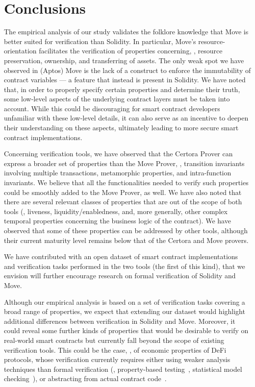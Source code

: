 \section{Conclusions}
\label{sec:conclusions}

The empirical analysis of our study validates the folklore knowledge 
that Move is better suited for verification than Solidity.
In particular, Move's resource-orientation facilitates the verification of properties concerning, \eg, resource preservation, ownership, and transferring of assets.
The only weak spot we have observed in (Aptos) Move
is the lack of a construct to enforce the immutability of contract variables ---
a feature that instead is present in Solidity.
We have noted that, in order to properly specify certain properties and determine their truth, some low-level aspects of the underlying contract layers must be taken into account.
While this could be discouraging for smart contract developers unfamiliar with these low-level details, it can also serve as an incentive to deepen their understanding on these aspects, ultimately leading to more secure smart contract implementations.  

Concerning verification tools,
we have observed that the Certora Prover can express a broader
set of properties than the Move Prover, \eg, 
transition invariants involving multiple transactions,
metamorphic properties,   
and intra-function invariants.
We believe that all the functionalities needed to verify such properties 
could be smoothly added to the Move Prover, as well. 
We have also noted that there are several relevant classes of properties that are out of the scope of both tools (\eg, liveness, liquidity/enabledness, and, more generally, other complex temporal properties concerning the business logic of the contract).
We have observed that some of these properties can be addressed by other tools, although their current maturity level remains below that of the Certora and Move provers.

We have contributed with an open dataset of smart contract implementations and verification tasks performed in the two tools (the first of this kind), that we envision will further encourage research on %
formal verification of Solidity and Move.

Although our empirical analysis is based on a set of \nTotProperties verification tasks covering a broad range of properties, we expect that extending our dataset would highlight additional differences between verification in Solidity and Move. Moreover, it could reveal some further kinds of properties that would be desirable to verify on real-world smart contracts but currently fall beyond the scope of existing verification tools.
This could be the case, \eg, of economic properties of DeFi protocols, whose verification currently requires either using weaker analysis techniques than formal verification (\eg, property-based testing~\cite{Milo22fmbc}, statistical model checking~\cite{BartolettiCJLMV22isola}), or 
abstracting from actual contract code~\cite{Tolmach21wtsc,SunLSJ21wtsc,Babel23clockwork,Nielsen23cpp,Pusceddu24fmbc}.
